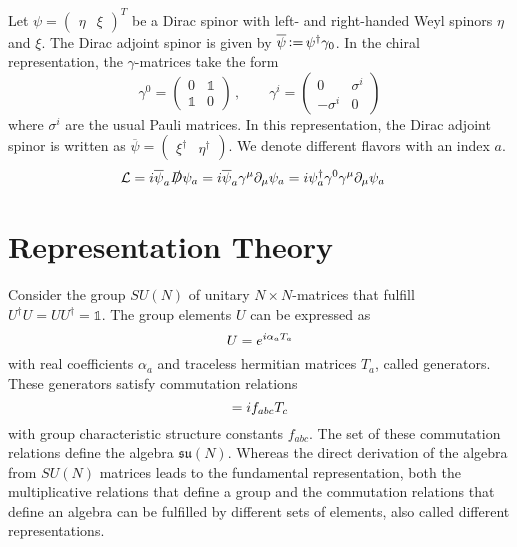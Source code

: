 Let ${\psi=\begin{pmatrix}\eta&\xi\end{pmatrix}^T}$ be a Dirac spinor with left- and right-handed Weyl spinors $\eta$ and $\xi$. The Dirac adjoint spinor is given by ${\overline{\psi}{\,\vcentcolon=\,}\psi^\dagger\gamma_0}$. In the chiral representation, the $\gamma$-matrices take the form
\begin{equation}
    \gamma^0=\begin{pmatrix}
        0&\mathbb{1}\\
        \mathbb{1}&0
    \end{pmatrix}\,,\qquad
    \gamma^i=\begin{pmatrix}
            0&\sigma^i\\
            -\sigma^i&0
    \end{pmatrix}
\end{equation}
where $\sigma^i$ are the usual Pauli matrices. In this representation, the Dirac adjoint spinor is written as ${\overline{\psi}=\begin{pmatrix}\xi^\dagger&\eta^\dagger\end{pmatrix}}$.
We denote different flavors with an index $a$.
\begin{subequations}
    \begin{align}
        \mathcal{L}&={i}\overline{\psi}_a\slashed{D}\psi_a={i}\overline{\psi}_a\gamma^\mu\partial_\mu\psi_a={i}\psi_a^\dagger\gamma^0\gamma^\mu\partial_\mu\psi_a
    \end{align}
\end{subequations}


\section{Representation Theory}
\label{sec:Apdx_RepTheory}

Consider the group $SU(N)$ of unitary ${N\times N}$-matrices that fulfill ${U^\dagger U=UU^\dagger=\mathbb{1}}$. The group elements $U$ can be expressed as
\begin{equation}
    U=e^{{i} \alpha_aT_a}
\end{equation}
with real coefficients $\alpha_a$ and traceless hermitian matrices $T_a$, called generators. These generators satisfy commutation relations
\begin{equation}
    [T_a,T_b]=\imagu f_{abc}T_c
\end{equation}
with group characteristic structure constants $f_{abc}$. The set of these commutation relations define the algebra $\mathfrak{su}(N)$. Whereas the direct derivation of the algebra from $SU(N)$ matrices leads to the fundamental representation, both the multiplicative relations that define a group and the commutation relations that define an algebra can be fulfilled by different sets of elements, also called different representations. 

